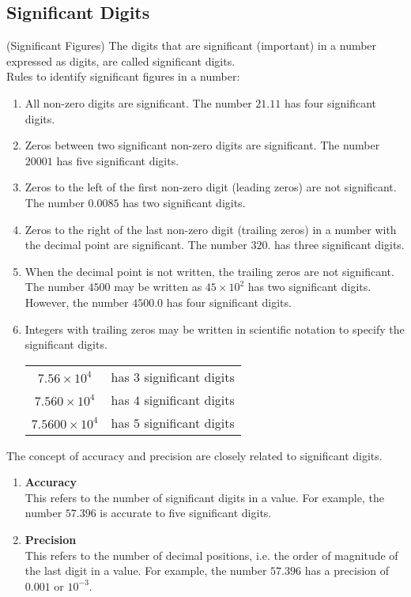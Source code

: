 \documentclass[aima203_lecturenotes_ku.tex]{subfiles}
\begin{document}
\subsection{Significant Digits} (Significant Figures)
The digits that are significant (important) in a number expressed as digits, are called significant digits. \\[2mm]
Rules to identify significant figures in a number:
\begin{enumerate}
\item All non-zero digits are significant. The number $21.11$ has four significant digits.

\item Zeros between two significant non-zero digits are significant. The number $20001$ has five significant digits.

\item Zeros to the left of the first non-zero digit (leading zeros) are not significant. The number $0.0085$ has two significant digits.

\item Zeros to the right of the last non-zero digit (trailing zeros) in a number with the decimal point are significant. The number $320.$ has three significant digits.

\item When the decimal point is not written, the trailing zeros are not significant. The number $4500$ may be written as $45 \times 10^2$ has two significant digits. However, the number $4500.0$ has four significant digits.

\item Integers with trailing zeros may be written in scientific notation to specify the significant digits.
  \begin{table}[h]
    \centering
    \begin{tabular}{|c|r|}
      \hline
      $7.56 \times 10^4$ & has $3$ significant digits \\[1mm]
      $7.560 \times 10^4$ & has $4$ significant digits \\[1mm]
      $7.5600 \times 10^4$ & has $5$ significant digits \\
      \hline
    \end{tabular}
  \end{table}
\end{enumerate}
The concept of accuracy and precision are closely related to significant digits.
\begin{enumerate}
\item \textbf{Accuracy} \\[1mm]
  This refers to the number of significant digits in a value. For example, the number $57.396$ is accurate to five significant digits.
\item \textbf{Precision} \\[1mm]
  This refers to the number of decimal positions, i.e. the order of magnitude of the last digit in a value. For example, the number $57.396$ has a precision of $0.001$ or $10^{-3}$.
\end{enumerate}
\end{document}
